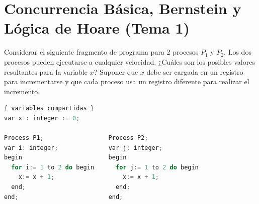 \documentclass[11pt,a4paper,twoside,openright]{report}
\begin{document}
\chapter{Concurrencia Básica, Bernstein y Lógica de Hoare (Tema 1)}
\label{bloque:hoare}


\begin{ejercicio}
Considerar el siguiente fragmento de programa para 2 procesos $P_1$ y $P_2$. Los dos procesos pueden ejecutarse a cualquier velocidad. ¿Cuáles son los posibles valores resultantes para la variable $x$? Suponer que $x$ debe ser cargada en un registro para incrementarse y que cada proceso usa un registro diferente para realizar el incremento.

\begin{lstlisting}[language=C++]
{ variables compartidas }
var x : integer := 0;

Process P1;                  Process P2;
var i: integer;              var j: integer;
begin                        begin
  for i:= 1 to 2 do begin      for j:= 1 to 2 do begin
    x:= x + 1;                   x:= x + 1;
  end;                         end;
end;                         end;
\end{lstlisting}
\end{ejercicio}
\end{document}
